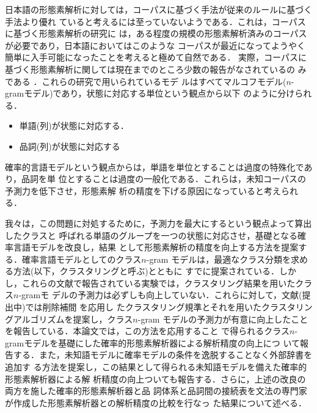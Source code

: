 日本語の形態素解析に対しては，コーパスに基づく手法が従来のルールに基づく手法より優れ
ていると考えるには至っていないようである．これは，コーパスに基づく形態素解析の研究に
は，ある程度の規模の形態素解析済みのコーパスが必要であり，日本語においてはこのような
コーパスが最近になってようやく簡単に入手可能になったことを考えると極めて自然である．
実際，コーパスに基づく形態素解析に関しては現在までのところ少数の報告がなされているの
みである
\cite{確率的形態素解析,
A.Stochastic.Japanese.Morphological.Analyzer.Using.a.Forward-DP.Backward-A*.N-Best.Search.Algorithm,
EDRコーパスを用いた確率的日本語形態素解析,
HMMによる日本語形態素解析システムのパラメータ学習}．これらの研究で用いられているモデ
ルはすべてマルコフモデル($n$-gramモデル)であり，状態に対応する単位という観点から以下
のように分けられる．
\begin{itemize}
\item 単語(列)が状態に対応する\cite{確率的形態素解析}．
\item 品詞(列)が状態に対応する
  \cite{A.Stochastic.Japanese.Morphological.Analyzer.Using.a.Forward-DP.Backward-A*.N-Best.Search.Algorithm,
  EDRコーパスを用いた確率的日本語形態素解析,
  HMMによる日本語形態素解析システムのパラメータ学習}
\end{itemize}
確率的言語モデルという観点からは，単語を単位とすることは過度の特殊化であり，品詞を単
位とすることは過度の一般化である．これらは，未知コーパスの予測力を低下させ，形態素解
析の精度を下げる原因になっていると考えられる．

我々は，この問題に対処するために，予測力を最大にするという観点よって算出したクラスと
呼ばれる単語のグループを一つの状態に対応させ，基礎となる確率言語モデルを改良し，結果
として形態素解析の精度を向上する方法を提案する．確率言語モデルとしてのクラス$n$-gram
モデルは，最適なクラス分類を求める方法(以下，クラスタリングと呼ぶ)とともに
すでに提案されている\cite{Class-Based.n-gram.Models.of.Natural.Language,
On.Structuring.Probabilistic.Dependences.in.Stochastic.Language.Modeling,
Improved.Clustering.Techniques.for.Class-Based.Statistical.Language.Modelling}．しか
し，これらの文献で報告されている実験では，クラスタリング結果を用いたクラス$n$-gramモ
デルの予測力は必ずしも向上していない．これらに対して，文献(提出中)では削除補間
\cite{Interpolated.estimation.of.Markov.source.parameters.from.sparse.data}を応用し
たクラスタリング規準とそれを用いたクラスタリングアルゴリズムを提案し，クラス$n$-gram
モデルの予測力が有意に向上したことを報告している．本論文では，この方法を応用すること
で得られるクラス$n$-gramモデルを基礎にした確率的形態素解析器による解析精度の向上につ
いて報告する．また，未知語モデルに確率モデルの条件を逸脱することなく外部辞書を追加す
る方法を提案し，この結果として得られる未知語モデルを備えた確率的形態素解析器による解
析精度の向上ついても報告する．さらに，上述の改良の両方を施した確率的形態素解析器と品
詞体系と品詞間の接続表を文法の専門家が作成した形態素解析器との解析精度の比較を行なっ
た結果について述べる．







